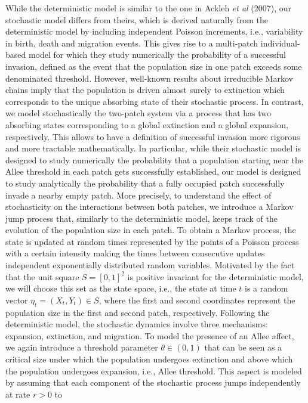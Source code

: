 \indent While the deterministic model is similar to the one in Ackleh \emph{et al} (2007), our stochastic model differs from theirs,
 which is derived naturally from the deterministic model by including independent Poisson increments, i.e., variability in birth, death
 and migration events.
 This gives rise to a multi-patch individual-based model for which they study numerically the probability of a successful invasion, defined
 as the event that the population size in one patch exceeds some denominated threshold.
 However, well-known results about irreducible Markov chains imply that the population is driven almost surely to extinction which corresponds
 to the unique absorbing state of their stochastic process.
 In contrast, we model stochastically the two-patch system via a process that has two absorbing states corresponding to a global extinction
 and a global expansion, respectively.
 This allows to have a definition of successful invasion more rigorous and more tractable mathematically.
 In particular, while their stochastic model is designed to study numerically the probability that a population starting near the Allee
 threshold in each patch gets successfully established, our model is designed to study analytically the probability that a fully occupied
 patch successfully invade a nearby empty patch.
 More precisely, to understand the effect of stochasticity on the interactions between both patches, we introduce a Markov jump process
 that, similarly to the deterministic model, keeps track of the evolution of the population size in each patch.
 To obtain a Markov process, the state is updated at random times represented by the points of a Poisson process with a certain intensity
 making the times between consecutive updates independent exponentially distributed random variables.
 Motivated by the fact that the unit square $S = [0, 1]^2$ is positive invariant for the deterministic model, we will choose this set as the
 state space, i.e., the state at time $t$ is a random vector $\eta_t = (X_t, Y_t) \in S$, where the first and
 second coordinates represent the population size in the first and second patch, respectively.
 Following the deterministic model, the stochastic dynamics involve three mechanisms: expansion, extinction, and migration.
 To model the presence of an Allee affect, we again introduce a threshold parameter $\theta \in (0, 1)$ that can be seen as a critical size
 under which the population undergoes extinction and above which the population undergoes expansion, i.e., Allee threshold.
 This aspect is modeled by assuming that each component of the stochastic process jumps independently at rate $r > 0$ to
